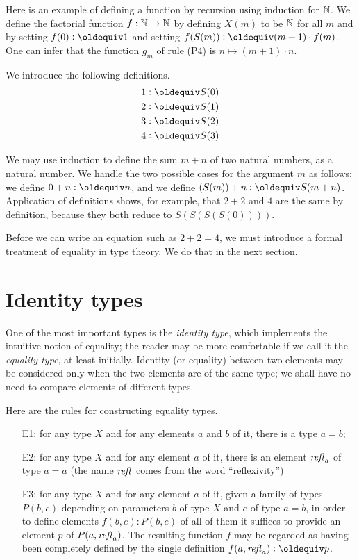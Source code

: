 Here is an example of defining a function by recursion using induction for $\mathbb{N}$.  We define the factorial function $f : \mathbb{N} \to \mathbb{N}$ by
defining $X(m)$ to be $\mathbb{N}$ for all $m$ and by setting $f(0) \defeq 1$ and setting $f(S(m)) \defeq (m+1) \cdot f(m)$.  One can infer that the
function $g_m$ of rule (P4) is $n \mapsto (m+1) \cdot n$.

We introduce the following definitions.
\begin{align*}
 1 & \defeq S(0) \\
 2 & \defeq S(1) \\
 3 & \defeq S(2) \\
 4 & \defeq S(3)
\end{align*}

We may use induction to define the sum $m+n$ of two natural numbers, as a natural number.  We handle the two possible cases for the argument $m$
as follows: we define $0+n \defeq n$, and we define $(S(m))+n \defeq S(m+n)$.  Application of definitions shows, for example, that $2+2$ and $4$
are the same by definition, because they both reduce to $S(S(S(S(0))))$.

Before we can write an equation such as $2+2=4$, we must introduce a formal treatment of equality in type theory.  We do that in the next section.

\section{Identity types}\label{paths}

One of the most important types is the {\em identity type}, which implements the intuitive notion of equality; the reader may be more
comfortable if we call it the {\em equality type}, at least initially.  Identity (or equality) between two elements may be considered only when
the two elements are of the same type; we shall have no need to compare elements of different types.

Here are the rules for constructing equality types.
\begin{enumerate}
\item[E1:]
  for any type $X$ and for any elements $a$ and $b$ of it, there is a type $a=b$;
\item[E2:] for any type $X$ and for any element $a$ of it, there is an element $\mathop{{\it refl}_{a}}$ of type $a=a$ (the name $\mathop{{\it refl}_{}}$ comes from the word
  ``reflexivity'')
\item[E3:] for any type $X$ and for any element $a$ of it, given a family of types $P(b,e)$ depending on parameters $b$ of type $X$ and $e$ of type
  $a=b$, in order to define elements $f(b,e) : P(b,e)$ of all of them it suffices to provide an element $p$ of $P(a,\mathop{{\it refl}_{a}})$.  The resulting
  function $f$ may be regarded as having been completely defined by the single definition $f(a,\refl a) \defeq p$.
\end{enumerate}

